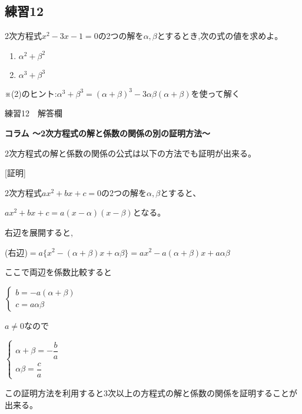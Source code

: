 \documentclass{jsarticle}
\begin{document}
\subsection*{練習12}
  2次方程式$x^2-3x-1=0$の2つの解を$\alpha,\beta$とするとき,次の式の値を求めよ。
\renewcommand{\labelenumi}{(\arabic{enumi})}
\begin{enumerate}
  \item 
    $\alpha^2+\beta^2$
  \item
    $\alpha^3+\beta^3$
\end{enumerate}
※(2)のヒント:$\alpha^3+\beta^3 = (\alpha+\beta)^3-3\alpha\beta(\alpha+\beta)$を使って解く
\begin{itembox}[l]{練習12　解答欄}
  \vspace{40mm}
\end{itembox}
\newpage
\begin{boxnote}
  \textbf{コラム ～2次方程式の解と係数の関係の別の証明方法～}\par
    2次方程式の解と係数の関係の公式は以下の方法でも証明が出来る。\par
  \vspace{2mm}
  [証明]\par
  2次方程式$ax^2+bx+c=0$の2つの解を$\alpha,\beta$とすると、\par
  $ax^2+bx+c = a(x-\alpha)(x-\beta)$となる。\par
  右辺を展開すると,\par 
  (右辺)$=a\{x^2-(\alpha+\beta)x+\alpha\beta\}=ax^2-a(\alpha+\beta)x+a\alpha\beta$\par
  ここで両辺を係数比較すると\par
  $\left\{\begin{array}{ll}
    b=-a(\alpha+\beta)\\
    c=a\alpha\beta
  \end{array}\right.$\par
  \vspace{2mm}
  $a\not=0$なので\par
  \vspace{2mm}
  $\left\{\begin{array}{ll}
    \alpha+\beta = -\dfrac{b}{a}\\
    \alpha\beta = \dfrac{c}{a}
  \end{array}\right.$
  \qquad\qquad[終]\par
  \vspace{4mm}
  この証明方法を利用すると3次以上の方程式の解と係数の関係を証明することが出来る。\par
  \vspace{2mm}

\end{boxnote}
\end{document}
